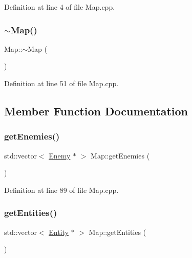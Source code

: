 Definition at line 4 of file Map.\+cpp.

\mbox{\label{class_map_aa403fbe09394ccf39747588f5168e3b2}} 
\subsubsection{\texorpdfstring{$\sim$\+Map()}{~Map()}}
{\footnotesize\ttfamily Map\+::$\sim$\+Map (\begin{DoxyParamCaption}{ }\end{DoxyParamCaption})}



Definition at line 51 of file Map.\+cpp.



\subsection{Member Function Documentation}
\mbox{\label{class_map_a8796db77b21d899391c8163f3accf32c}} 
\subsubsection{\texorpdfstring{get\+Enemies()}{getEnemies()}}
{\footnotesize\ttfamily std\+::vector$<$ \hyperlink{class_enemy}{Enemy} $\ast$ $>$ Map\+::get\+Enemies (\begin{DoxyParamCaption}{ }\end{DoxyParamCaption})}



Definition at line 89 of file Map.\+cpp.

\mbox{\label{class_map_a2321c241804c5ed69c0bc7d073f901fd}} 
\subsubsection{\texorpdfstring{get\+Entities()}{getEntities()}}
{\footnotesize\ttfamily std\+::vector$<$ \hyperlink{class_entity}{Entity} $\ast$ $>$ Map\+::get\+Entities (\begin{DoxyParamCaption}{ }\end{DoxyParamCaption})}



